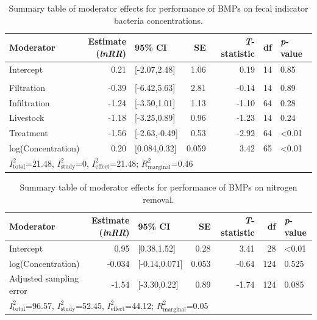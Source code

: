 \documentclass[utf8]{FrontiersinHarvard}
\begin{document}
\begin{table}

\caption{Summary table of moderator effects for performance of BMPs on fecal indicator bacteria concentrations.}
\centering
\begin{tabular}[t]{lrlrrrl}
\toprule
Moderator & \makecell[r]{Estimate\\(\textit{lnRR})} & 95\% CI & SE & \textit{T}-statistic & df & \textit{p}-value\\
\midrule
Intercept & 0.21 & {}[-2.07,2.48] & 1.06 & 0.19 & 14 & 0.85\\
\addlinespace[0.3em]
\multicolumn{7}{l}{\textbf{BMP Subcategories}}\\
\hspace{1em}Filtration & -0.39 & {}[-6.42,5.63] & 2.81 & -0.14 & 14 & 0.89\\
\hspace{1em}Infiltration & -1.24 & {}[-3.50,1.01] & 1.13 & -1.10 & 64 & 0.28\\
\hspace{1em}Livestock & -1.18 & {}[-3.25,0.89] & 0.96 & -1.23 & 14 & 0.24\\
\hspace{1em}Treatment & -1.56 & {}[-2.63,-0.49] & 0.53 & -2.92 & 64 & \textless 0.01\\
log(Concentration) & 0.20 & {}[0.084,0.32] & 0.059 & 3.42 & 65 & \textless 0.01\\
\bottomrule
\multicolumn{7}{l}{\rule{0pt}{1em}$I^{2}_{\text{total}}$=21.48, $I^{2}_{\text{study}}$=0, $I^{2}_{\text{effect}}$=21.48; $R^{2}_{\text{marginal}}$=0.46}\\
\end{tabular}
\end{table}

\begin{table}

\caption{Summary table of moderator effects for performance of BMPs on nitrogen removal.}
\centering
\begin{tabular}[t]{lrlrrrl}
\toprule
Moderator & \makecell[r]{Estimate\\(\textit{lnRR})} & 95\% CI & SE & \textit{T}-statistic & df & \textit{p}-value\\
\midrule
Intercept & 0.95 & {}[0.38,1.52] & 0.28 & 3.41 & 28 & \textless 0.01\\
log(Concentration) & -0.034 & {}[-0.14,0.071] & 0.053 & -0.64 & 124 & 0.525\\
Adjusted sampling error & -1.54 & {}[-3.30,0.22] & 0.89 & -1.74 & 124 & 0.085\\
\bottomrule
\multicolumn{7}{l}{\rule{0pt}{1em}$I^{2}_{\text{total}}$=96.57, $I^{2}_{\text{study}}$=52.45, $I^{2}_{\text{effect}}$=44.12; $R^{2}_{\text{marginal}}$=0.05}\\
\end{tabular}
\end{table}
\end{document}
